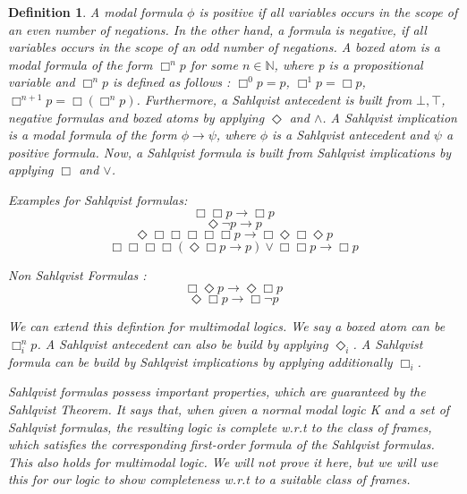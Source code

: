 \documentclass[12pt, a4paper]{scrartcl}
\newtheorem{definition}{Definition}[subsection]
\begin{document}
\begin{definition}
    A modal formula $\phi$ is positive if all variables occurs in the scope of an even number of negations. In the other hand, a formula is negative, if all variables occurs in the scope of an odd number of negations.
    A boxed atom is a modal formula of the form $\Box^n p$ for some $n \in \mathbb{N}$, where p is a propositional variable and $\Box^n p$ is defined as follows :
    $\Box^0 p = p$, $\Box^1 p = \Box p$, $\Box^{n+1} p = \Box(\Box^n p)$. \newline \newline
    Furthermore, a Sahlqvist antecedent is built from $\bot, \top$, negative formulas and boxed atoms by applying $\Diamond$ and $\land$. A Sahlqvist implication is a modal formula of the form
    $\phi \rightarrow \psi$, where $\phi$ is a Sahlqvist antecedent and $\psi$ a positive formula. \newline
    Now, a Sahlqvist formula is built from Sahlqvist implications by applying $\Box$ and $\lor$. \newline
    
    Examples for Sahlqvist formulas: 
    $$\Box \Box p \rightarrow \Box p$$
    $$ \Diamond \neg p\rightarrow p$$
    $$ \Diamond \Box \Box \Box \Box \Box p\rightarrow \Box \Diamond \Box \Diamond p$$
    $$ \Box\Box\Box\Box(\Diamond \Box p\rightarrow p) \lor \Box \Box p \rightarrow \Box p $$
    
    Non Sahlqvist Formulas :
    $$\Box \Diamond p \rightarrow \Diamond \Box p$$
    $$\Diamond \Box p \rightarrow \Box \neg p$$ \newline
    
    We can extend this defintion for multimodal logics. We say a boxed atom can be $\Box^n_i p$. A Sahlqvist antecedent
    can also be build by applying $\Diamond_i$. A Sahlqvist formula can be build by
    Sahlqvist implications by applying additionally $\Box_i$.  \newline
    
    Sahlqvist formulas possess important properties, which are guaranteed by the Sahlqvist Theorem. It says that, when given a normal modal logic K and a set of Sahlqvist formulas, the resulting logic is complete w.r.t 
    to the class of frames, which satisfies the corresponding first-order formula of the Sahlqvist formulas. This also holds for multimodal logic. We will not prove it here, but we will use this
    for our logic to show completeness w.r.t to a suitable class of frames.
    \newline
        
\end{definition}
\end{document}

